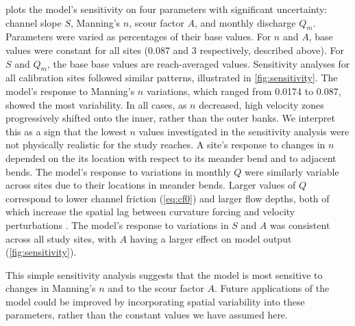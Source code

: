 \documentclass[preprint, review, authoryear, 12pt]{elsarticle}
\begin{document}
 plots the model's sensitivity on four parameters with significant uncertainty: channel slope $S$, Manning's $n$, scour factor $A$, and monthly discharge $Q_m$. Parameters were varied as percentages of their base values. For $n$ and $A$, base values were constant for all sites (0.087 and 3 respectively, described above). For $S$ and $Q_m$, the base base values are reach-averaged values. Sensitivity analyses for all calibration sites followed similar patterns, illustrated in \cref{fig:sensitivity}. The model's response to Manning's $n$ variations, which ranged from 0.0174 to 0.087, showed the most variability. In all cases, as $n$ decreased, high velocity zones progressively shifted onto the inner, rather than the outer banks. We interpret this as a sign that the lowest $n$ values investigated in the sensitivity analysis were not physically realistic for the study reaches. A site's response to changes in $n$ depended on the its location with respect to its meander bend and to adjacent bends. The model's response to variations in monthly $Q$ were similarly variable across sites due to their locations in meander bends. Larger values of $Q$ correspond to lower channel friction (\cref{eq:cf0}) and larger flow depths, both of which increase the spatial lag between curvature forcing and velocity perturbations \citep{Blanckaert2010}. The model's response to variations in $S$ and $A$ was consistent across all study sites, with $A$ having a larger effect on model output (\cref{fig:sensitivity}).

This simple sensitivity analysis suggests that the model is most sensitive to changes in Manning's $n$ and to the scour factor $A$. Future applications of the model could be improved by incorporating spatial variability into these parameters, rather than the constant values we have assumed here.
\end{document}
